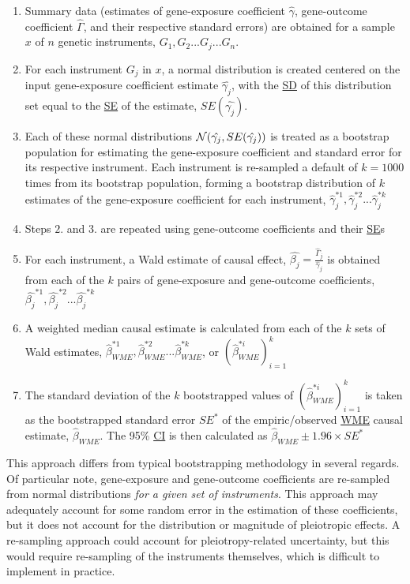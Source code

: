 \documentclass[
]{article}
\providecommand{\tightlist}{%
  \setlength{\itemsep}{0pt}\setlength{\parskip}{0pt}}
\begin{document}
\begin{enumerate}
\def\labelenumi{\arabic{enumi}.}
\tightlist
\item
  Summary data (estimates of gene-exposure coefficient \(\hat{\gamma}\), gene-outcome coefficient \(\hat{\Gamma}\), and their respective standard errors) are obtained for a sample \(x\) of \(n\) genetic instruments, \(G_1, G_2...G_j...G_n\).
\item
  For each instrument \(G_j\) in \(x\), a normal distribution is created centered on the input gene-exposure coefficient estimate \(\hat{\gamma_j}\), with the \hyperref[acronyms_SD]{SD} of this distribution set equal to the \hyperref[acronyms_SE]{SE} of the estimate, \(SE({\hat{\gamma_j}})\).
\item
  Each of these normal distributions \(\mathcal{N}(\space \hat{\gamma_j}, \space SE({\hat{\gamma_j}})\space)\) is treated as a bootstrap population for estimating the gene-exposure coefficient and standard error for its respective instrument. Each instrument is re-sampled a default of \(k = 1000\) times from its bootstrap population, forming a bootstrap distribution of \(k\) estimates of the gene-exposure coefficient for each instrument, \(\hat{\gamma}_j^{*1}, \hat{\gamma}_j^{*2}...\hat{\gamma}_j^{*k}\)
\item
  Steps \(2.\) and \(3.\) are repeated using gene-outcome coefficients and their \hyperref[acronyms_SE]{SE}s
\item
  For each instrument, a Wald estimate of causal effect, \(\hat{\beta_j} = \frac{\hat{\Gamma}_j}{\hat{\gamma}_j}\) is obtained from each of the \(k\) pairs of gene-exposure and gene-outcome coefficients, \(\hat{\beta_j}^{*1}, \hat{\beta_j}^{*2}...\hat{\beta_j}^{*k}\)
\item
  A weighted median causal estimate is calculated from each of the \(k\) sets of Wald estimates, \(\hat{\beta}_{WME}^{*1}, \hat{\beta}_{WME}^{*2}...\hat{\beta}_{WME}^{*k}\), or \((\hat{\beta}_{WME}^{*i})_{i=1}^k\)
\item
  The standard deviation of the \(k\) bootstrapped values of \((\hat{\beta}_{WME}^{*i})_{i=1}^k\) is taken as the bootstrapped standard error \(SE^*\) of the empiric/observed \hyperref[acronyms_WME]{WME} causal estimate, \(\hat{\beta}_{WME}\). The 95\% \hyperref[acronyms_CI]{CI} is then calculated as \(\hat{\beta}_{WME} \pm 1.96  \times SE^*\)
\end{enumerate}

This approach differs from typical bootstrapping methodology in several regards. Of particular note, gene-exposure and gene-outcome coefficients are re-sampled from normal distributions \emph{for a given set of instruments}. This approach may adequately account for some random error in the estimation of these coefficients, but it does not account for the distribution or magnitude of pleiotropic effects. A re-sampling approach could account for pleiotropy-related uncertainty, but this would require re-sampling of the instruments themselves, which is difficult to implement in practice.
\end{document}
